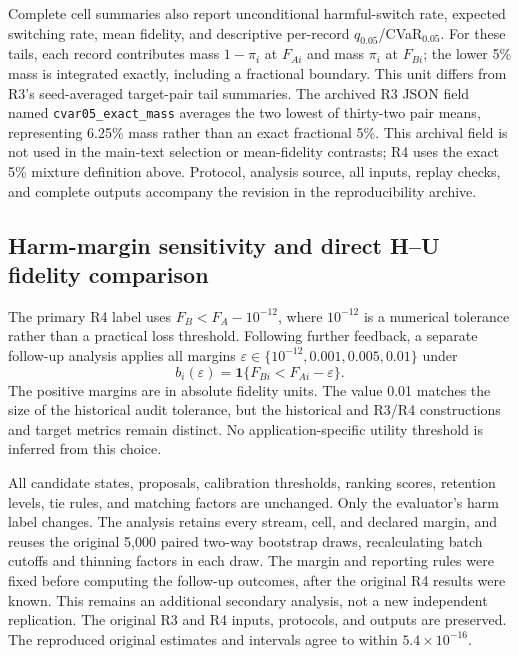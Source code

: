 \documentclass[11pt]{article}
\numberwithin{equation}{section}
\begin{document}
Complete cell summaries also report unconditional harmful-switch rate,
expected switching rate, mean fidelity, and descriptive per-record
$q_{0.05}$/CVaR$_{0.05}$.  For these tails, each record contributes mass
$1-\pi_i$ at $F_{Ai}$ and mass $\pi_i$ at $F_{Bi}$; the lower 5\% mass
is integrated exactly, including a fractional boundary.  This unit differs
from R3's seed-averaged target-pair tail summaries.  The archived R3 JSON
field named \texttt{cvar05\_exact\_mass} averages the two lowest of thirty-two
pair means, representing 6.25\% mass rather than an exact fractional 5\%.
This archival field is not used in the main-text selection or mean-fidelity
contrasts; R4 uses the exact 5\% mixture definition above.
Protocol, analysis source,
all inputs, replay checks, and complete outputs accompany the revision in
the reproducibility archive.



\FloatBarrier
\subsection{Harm-margin sensitivity and direct H--U fidelity comparison}
\label{subsec:r4-harm-sensitivity}

The primary R4 label uses
$F_B<F_A-10^{-12}$, where $10^{-12}$ is a numerical tolerance rather
than a practical loss threshold.  Following further feedback, a separate
follow-up analysis applies all margins
$\varepsilon\in\{10^{-12},0.001,0.005,0.01\}$ under
\begin{equation}
b_i(\varepsilon)=\mathbf1\{F_{Bi}<F_{Ai}-\varepsilon\}.
\end{equation}
The positive margins are in absolute fidelity units.  The value 0.01
matches the size of the historical audit tolerance, but the historical and
R3/R4 constructions and target metrics remain distinct.
No application-specific utility threshold is inferred from this choice.

All candidate states, proposals, calibration thresholds, ranking scores,
retention levels, tie rules, and matching factors are unchanged.  Only
the evaluator's harm label changes.  The analysis retains every stream,
cell, and declared margin, and reuses the original 5,000 paired two-way
bootstrap draws, recalculating batch cutoffs and thinning factors in each
draw.  The margin and reporting rules were fixed before computing the
follow-up outcomes, after the original R4 results were known.  This remains
an additional secondary analysis, not a new independent replication.
The original R3 and R4 inputs, protocols, and outputs are preserved.
The reproduced original estimates and intervals agree to within
$5.4\times10^{-16}$.
\end{document}
